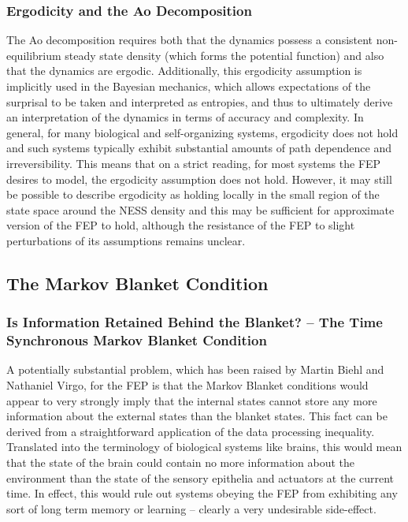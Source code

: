 \subsubsection{Ergodicity and the Ao Decomposition}

The Ao decomposition requires both that the dynamics possess a consistent non-equilibrium steady state density (which forms the potential function) and also that the dynamics are ergodic. Additionally, this ergodicity assumption is implicitly used in the Bayesian mechanics, which allows expectations of the surprisal to be taken and interpreted as entropies, and thus to ultimately derive an interpretation of the dynamics in terms of accuracy and complexity. In general, for many biological and self-organizing systems, ergodicity does not hold and such systems typically exhibit substantial amounts of path dependence and irreversibility. This means that on a strict reading, for most systems the FEP desires to model, the ergodicity assumption does not hold. However, it may still be possible to describe ergodicity as holding locally in the small region of the state space around the NESS density and this may be sufficient for approximate version of the FEP to hold, although the resistance of the FEP to slight perturbations of its assumptions remains unclear.

\subsection{The Markov Blanket Condition}
\subsubsection{Is Information Retained Behind the Blanket? -- The Time Synchronous Markov Blanket Condition}

A potentially substantial problem, which has been raised by Martin Biehl and Nathaniel Virgo, for the FEP is that the Markov Blanket conditions would appear to very strongly imply that the internal states cannot store any more information about the external states than the blanket states. This fact can be derived from a straightforward application of the data processing inequality. Translated into the terminology of biological systems like brains, this would mean that the state of the brain could contain no more information about the environment than the state of the sensory epithelia and actuators at the current time. In effect, this would rule out systems obeying the FEP from exhibiting any sort of long term memory or learning -- clearly a very undesirable side-effect. 

